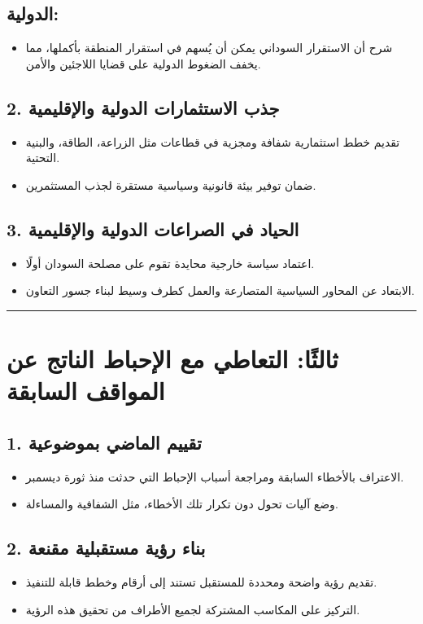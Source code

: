\documentclass[12pt]{article}
\begin{document}
\subsection{الدولية:}
\begin{itemize}
    \item شرح أن الاستقرار السوداني يمكن أن يُسهم في استقرار المنطقة بأكملها، مما يخفف الضغوط الدولية على قضايا اللاجئين والأمن.
\end{itemize}

\subsection{2. جذب الاستثمارات الدولية والإقليمية}
\begin{itemize}
    \item تقديم خطط استثمارية شفافة ومجزية في قطاعات مثل الزراعة، الطاقة، والبنية التحتية.
    \item ضمان توفير بيئة قانونية وسياسية مستقرة لجذب المستثمرين.
\end{itemize}

\subsection{3. الحياد في الصراعات الدولية والإقليمية}
\begin{itemize}
    \item اعتماد سياسة خارجية محايدة تقوم على مصلحة السودان أولًا.
    \item الابتعاد عن المحاور السياسية المتصارعة والعمل كطرف وسيط لبناء جسور التعاون.
\end{itemize}

\hrule

\section{ثالثًا: التعاطي مع الإحباط الناتج عن المواقف السابقة}
\subsection{1. تقييم الماضي بموضوعية}
\begin{itemize}
    \item الاعتراف بالأخطاء السابقة ومراجعة أسباب الإحباط التي حدثت منذ ثورة ديسمبر.
    \item وضع آليات تحول دون تكرار تلك الأخطاء، مثل الشفافية والمساءلة.
\end{itemize}

\subsection{2. بناء رؤية مستقبلية مقنعة}
\begin{itemize}
    \item تقديم رؤية واضحة ومحددة للمستقبل تستند إلى أرقام وخطط قابلة للتنفيذ.
    \item التركيز على المكاسب المشتركة لجميع الأطراف من تحقيق هذه الرؤية.
\end{itemize}
\end{document}
